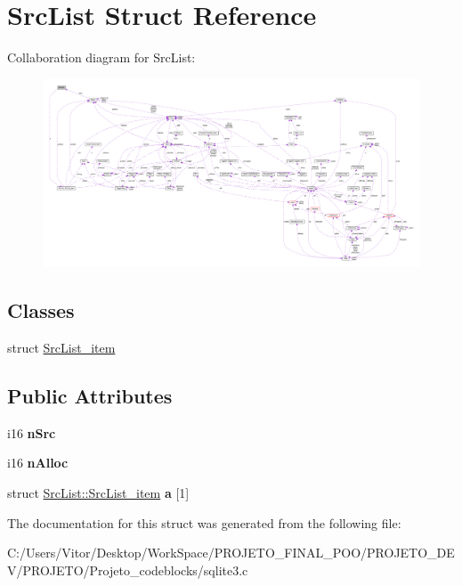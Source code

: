 \hypertarget{struct_src_list}{\section{Src\-List Struct Reference}
\label{struct_src_list}
}


Collaboration diagram for Src\-List\-:\nopagebreak
\begin{figure}[H]
\begin{center}
\leavevmode
\includegraphics[width=350pt]{struct_src_list__coll__graph}
\end{center}
\end{figure}
\subsection*{Classes}
\begin{DoxyCompactItemize}
\item 
struct \hyperlink{struct_src_list_1_1_src_list__item}{Src\-List\-\_\-item}
\end{DoxyCompactItemize}
\subsection*{Public Attributes}
\begin{DoxyCompactItemize}
\item 
\hypertarget{struct_src_list_a99c1d923c49fc0598d92f1cb54958ef4}{i16 {\bfseries n\-Src}}\label{struct_src_list_a99c1d923c49fc0598d92f1cb54958ef4}

\item 
\hypertarget{struct_src_list_aae88b994b131fea8c733aa609bae7e6e}{i16 {\bfseries n\-Alloc}}\label{struct_src_list_aae88b994b131fea8c733aa609bae7e6e}

\item 
\hypertarget{struct_src_list_acd181938f7144b40022b28072247aa3d}{struct \hyperlink{struct_src_list_1_1_src_list__item}{Src\-List\-::\-Src\-List\-\_\-item} {\bfseries a} \mbox{[}1\mbox{]}}\label{struct_src_list_acd181938f7144b40022b28072247aa3d}

\end{DoxyCompactItemize}


The documentation for this struct was generated from the following file\-:\begin{DoxyCompactItemize}
\item 
C\-:/\-Users/\-Vitor/\-Desktop/\-Work\-Space/\-P\-R\-O\-J\-E\-T\-O\-\_\-\-F\-I\-N\-A\-L\-\_\-\-P\-O\-O/\-P\-R\-O\-J\-E\-T\-O\-\_\-\-D\-E\-V/\-P\-R\-O\-J\-E\-T\-O/\-Projeto\-\_\-codeblocks/sqlite3.\-c\end{DoxyCompactItemize}
